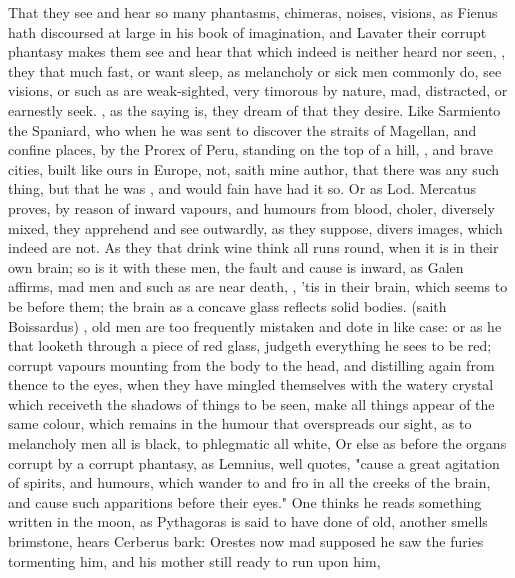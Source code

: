 {That they see and hear so many phantasms, chimeras, noises, visions, \etc{} as
Fienus hath discoursed at large in his book of imagination, and
Lavater  their corrupt phantasy makes them see and hear that which indeed is
neither heard nor seen, ,
they that much fast, or want sleep, as melancholy or sick men commonly do, see
visions, or such as are weak-sighted, very timorous by nature, mad, distracted,
or earnestly seek. , as the saying is, they
dream of that they desire. Like Sarmiento the Spaniard, who when he was sent to
discover the straits of Magellan, and confine places, by the Prorex of Peru,
standing on the top of a hill, ,
and brave cities, built like ours in Europe, not, saith mine
author, that there was any such thing, but that he was
, and would fain have had it so. Or as
Lod. Mercatus proves, by reason of inward vapours, and
humours from blood, choler, \etc{} diversely mixed, they apprehend and see
outwardly, as they suppose, divers images, which indeed are not. As they that
drink wine think all runs round, when it is in their own brain; so is it with
these men, the fault and cause is inward, as Galen affirms,
mad men and such as are near death, , 'tis in their brain, which seems
to be before them; the brain as a concave glass reflects solid bodies.
 (saith Boissardus) , old men are
too frequently mistaken and dote in like case: or as he that looketh through a
piece of red glass, judgeth everything he sees to be red; corrupt vapours
mounting from the body to the head, and distilling again from thence to the
eyes, when they have mingled themselves with the watery crystal which receiveth
the shadows of things to be seen, make all things appear of the same colour,
which remains in the humour that overspreads our sight, as to melancholy men
all is black, to phlegmatic all white, \etc{} Or else as before the organs
corrupt by a corrupt phantasy, as Lemnius,  well quotes, "cause a great agitation of spirits,
and humours, which wander to and fro in all the creeks of the brain, and cause
such apparitions before their eyes." One thinks he reads something written in
the moon, as Pythagoras is said to have done of old, another smells brimstone,
hears Cerberus bark: Orestes now mad supposed he saw the furies tormenting him,
and his mother still ready to run upon him,

}
